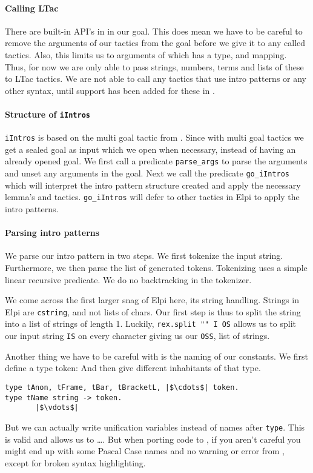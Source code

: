 \documentclass[thesis.tex]{subfiles}
\begin{document}
{{{\paragraph*{Calling LTac}
There are built-in API's in \ce in our goal. This does mean we have to be careful to remove the arguments of our tactics from the goal before we give it to any called tactics. Also, this limits us to arguments of which \ce has a type, and mapping. Thus, for now we are only able to pass strings, numbers, terms and lists of these to LTac tactics. We are not able to call any tactics that use \coq intro patterns or any other syntax, until support has been added for these in \ce.

\paragraph*[Structure of iIntros]{Structure of \texttt{iIntros}}
\texttt{iIntros} is based on the multi goal tactic from \ce. Since with multi goal tactics we get a sealed goal as input which we open when necessary, instead of having an already opened goal. We first call a predicate \texttt{parse_args} to parse the arguments and unset any arguments in the goal. Next we call the predicate \texttt{go_iIntros} which will interpret the intro pattern structure created and apply the necessary lemma's and tactics. \texttt{go_iIntros} will defer to other tactics in Elpi to apply the intro patterns.

\paragraph*{Parsing intro patterns}
We parse our intro pattern in two steps. We first tokenize the input string. Furthermore, we then parse the list of generated tokens. Tokenizing uses a simple linear recursive predicate. We do no backtracking in the tokenizer.

We come across the first larger snag of Elpi here, its string handling. Strings in Elpi are \texttt{cstring}, and not lists of chars. Our first step is thus to split the string into a list of strings of length 1. Luckily, \texttt{rex.split "" I OS} allows us to split our input string \texttt{IS} on every character giving us our \texttt{OSS}, list of strings.

Another thing we have to be careful with is the naming of our constants. We first define a type token:  And then give different inhabitants of that type.
\begin{verbatim}
type tAnon, tFrame, tBar, tBracketL, |$\cdots$| token.
type tName string -> token.
       |$\vdots$|
\end{verbatim}
But we can actually write unification variables instead of names after \texttt{type}. This is valid \elpi and allows us to \dots. But when porting \coq code to \elpi, if you aren't careful you might end up with some Pascal Case names and no warning or error from \elpi, except for broken syntax highlighting.

}}}
\end{document}
